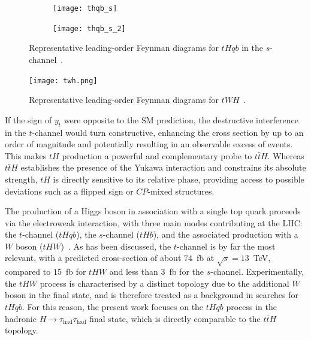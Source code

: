   \begin{figure}[htbp]
    \centering
    \begin{subfigure}[b]{0.4\textwidth}
      \centering
      \texttt{[image: thqb\_s]}
    \end{subfigure}
    \begin{subfigure}[b]{0.4\textwidth}
      \centering
      \texttt{[image: thqb\_s\_2]}
    \end{subfigure}
    \caption{Representative leading-order Feynman diagrams for $tHqb$ in the $s$-channel~\cite{Barger_2010}.}
    \label{fig:feynman_tH_s}
  \end{figure}

\begin{figure}[htbp]
    \centering
    \texttt{[image: twh.png]}
    \caption{Representative leading-order Feynman diagrams for $tWH$~\cite{twh}.}
    \label{fig:feynman_tWH}
  \end{figure}

If the sign of $y_{t}$ were opposite to the SM prediction, the destructive interference in the $t$-channel would turn constructive, enhancing the cross section by up to an order of magnitude and potentially resulting in an observable excess of events. 
This makes $tH$ production a powerful and complementary probe to $t\bar{t}H$. 
Whereas $t\bar{t}H$ establishes the presence of the Yukawa interaction and constrains its absolute strength, $tH$ is directly sensitive to its relative phase, providing access to possible deviations such as a flipped sign or $CP$-mixed structures. 
  
  
  The production of a Higgs boson in association with a single top quark proceeds via the electroweak interaction, with three main modes contributing at the LHC: the $t$-channel ($tHqb$), the $s$-channel ($tHb$), and the associated production with a $W$ boson ($tHW$)~\cite{demartin2015higgsproductionassociationsingle,Demartin_2017}. 
  As has been discussed, the $t$-channel is by far the most relevant, with a predicted cross-section of about $74$~fb at $\sqrt{s}=13$~TeV, compared to $15$~fb for $tHW$ and less than $3$~fb for the $s$-channel. 
  Experimentally, the $tHW$ process is characterised by a distinct topology due to the additional $W$ boson in the final state, and is therefore treated as a background in searches for $tHqb$. 
  For this reason, the present work focuses on the $tHqb$ process in the hadronic $H\to\tau_{\mathrm{had}}\tau_{\mathrm{had}}$ final state, which is directly comparable to the $t\bar{t}H$ topology. 
  
